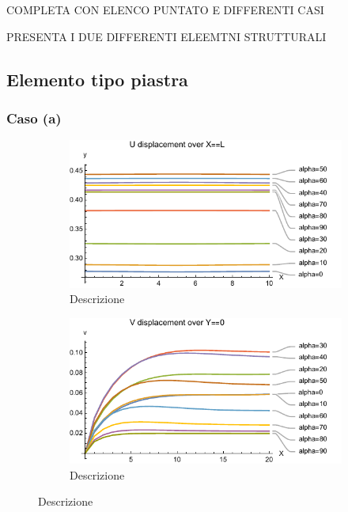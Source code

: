 \documentclass[a4paper,num-refs]{oup-contemporary}
\begin{document}
COMPLETA CON ELENCO PUNTATO E DIFFERENTI CASI 

PRESENTA I DUE DIFFERENTI ELEEMTNI STRUTTURALI
\textcolor{blue}{\lipsum[1-2]}





\subsection{Elemento tipo piastra}
\subsubsection{Caso (a)}
\label{sec:plate_A}

\begin{figure}[bt!]
	\centering
	\begin{subfigure}[t]{0.45\textwidth}
		\centering
		
		\includegraphics[width=\textwidth]{U_Y=.pdf}
		\caption{Descrizione}
		
	\end{subfigure}
	\hfill
	\begin{subfigure}[t]{0.45\textwidth}
		\centering
		\includegraphics[width=\textwidth]{V_X=.pdf}
		\caption{Descrizione}
		

\end{subfigure}
\end{figure}
\end{document}
